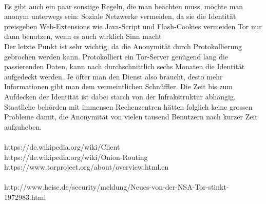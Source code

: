 \\
Es gibt auch ein paar sonstige Regeln, die man beachten muss, möchte man anonym unterwegs sein:
Soziale Netzwerke vermeiden, da sie die Identität preisgeben
Web-Extensions wie Java-Script und Flash-Cookies vermeiden
Tor nur dann benutzen, wenn es auch wirklich Sinn macht
\\
Der letzte Punkt ist sehr wichtig, da die Anonymität durch Protokollierung gebrochen werden kann. Protokolliert ein Tor-Server genügend lang die passierenden Daten, kann nach durchschnittlich sechs Monaten die Identität aufgedeckt werden. Je öfter man den Dienst also braucht, desto mehr Informationen gibt man dem vermeintlichen Schnüffler. Die Zeit bis zum Aufdecken der Identität ist dabei starch von der Infrakstruktur abhängig. Staatliche behörden mit immensen Rechenzentren hätten folglich keine grossen Probleme damit, die Anonymität von vielen tausend Benutzern nach kurzer Zeit aufzuheben.
\\%
\\https://de.wikipedia.org/wiki/Client
\\https://de.wikipedia.org/wiki/Onion-Routing
\\https://www.torproject.org/about/overview.html.en
\\%
\\http://www.heise.de/security/meldung/Neues-von-der-NSA-Tor-stinkt-1972983.html
